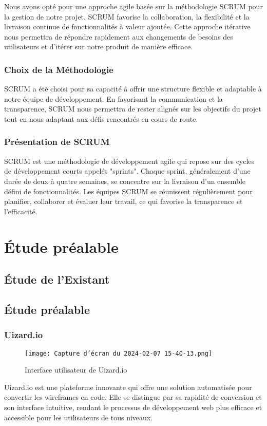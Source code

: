 Nous avons opté pour une approche agile basée sur la méthodologie SCRUM pour la gestion de notre projet. SCRUM favorise la collaboration, la flexibilité et la livraison continue de fonctionnalités à valeur ajoutée. Cette approche itérative nous permettra de répondre rapidement aux changements de besoins des utilisateurs et d'itérer sur notre produit de manière efficace.

\subsubsection{Choix de la Méthodologie}

SCRUM a été choisi pour sa capacité à offrir une structure flexible et adaptable à notre équipe de développement. En favorisant la communication et la transparence, SCRUM nous permettra de rester alignés sur les objectifs du projet tout en nous adaptant aux défis rencontrés en cours de route.

\subsubsection{Présentation de SCRUM}

SCRUM est une méthodologie de développement agile qui repose sur des cycles de développement courts appelés "sprints". Chaque sprint, généralement d'une durée de deux à quatre semaines, se concentre sur la livraison d'un ensemble défini de fonctionnalités. Les équipes SCRUM se réunissent régulièrement pour planifier, collaborer et évaluer leur travail, ce qui favorise la transparence et l'efficacité.

\section{Étude préalable}
\subsection{Étude de l'Existant}
\subsection{Étude préalable}

\subsubsection{Uizard.io}
\begin{figure}[h]
    \centering
    \texttt{[image: Capture d’écran du 2024-02-07 15-40-13.png]}
    \caption{Interface utilisateur de Uizard.io}
    \label{fig:uizard_interface}
\end{figure}
Uizard.io est une plateforme innovante qui offre une solution automatisée pour convertir les wireframes en code. Elle se distingue par sa rapidité de conversion et son interface intuitive, rendant le processus de développement web plus efficace et accessible pour les utilisateurs de tous niveaux.


